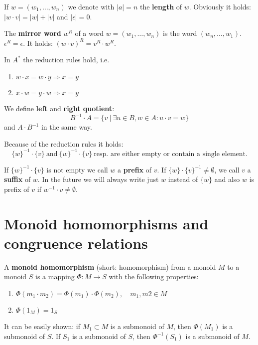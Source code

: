 If $w = (w_1,\ldots,w_n)$ we denote with $|a| = n$ the {\bf length} of $w$.
Obviously it holds: $|w \cdot v| = |w| + |v|$ and $|\epsilon| = 0$.

The {\bf mirror word} $w^R$ of a word $w = (w_1,\ldots,w_n)$ is the word
$(w_n,\ldots,w_1)$. $\epsilon^R = \epsilon$. It holds: $(w \cdot v)^R =
v^R \cdot w^R$.

In $A^*$ the reduction rules hold, i.e.
\begin{enumerate}
  \item $w \cdot x = w \cdot y \Rightarrow x = y$
  \item $x \cdot w = y \cdot w \Rightarrow x = y$
\end{enumerate}

We define {\bf left} and {\bf right quotient}:
\[ B^{-1} \cdot A = \{ v\ |\ \exists u \in B, w \in A : u \cdot v = w \} \]
and $A \cdot B^{-1}$ in the same way.

Because of the reduction rules it holds:
\[ \{w\}^{-1} \cdot \{v\}\ \mbox{and}\ \{w\}^{-1} \cdot \{v\}\ \mbox{resp. are
either empty or contain a single element.} \]

If $\{w\}^{-1} \cdot \{v\}$ is not empty we call $w$ a {\bf prefix} of $v$. If
$\{w\} \cdot \{v\}^{-1} \not= \emptyset $, we call $v$ a {\bf suffix} of $w$. In
the future we will always write just $w$ instead of $\{w\}$ and also $w$ is
prefix of $v$ if $w^{-1} \cdot v \not= \emptyset$.





\section{Monoid homomorphisms and congruence relations}

\begin{definition}
A {\bf monoid homomorphism} (short: homomorphism) from a monoid $M$ to a monoid
$S$ is a mapping $\Phi : M \to S$ with the following properties:
\begin{enumerate}
  \item $\Phi(m_1 \cdot m_2) = \Phi(m_1) \cdot \Phi(m_2), \quad m_1, m2 \in M$
  \item $\Phi(1_M) = 1_S$
\end{enumerate}
\end{definition}

It can be easily shown: if $M_1 \subset M$ is a submonoid of $M$, then
$\Phi(M_1)$ is a submonoid of $S$. If $S_1$ is a submonoid of $S$, then
$\Phi^{-1}(S_1)$ is a submonoid of $M$.

